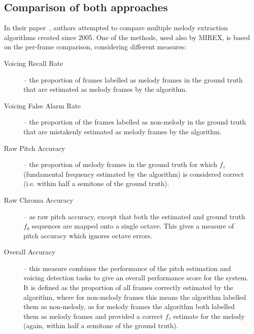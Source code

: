 \vspace{10pt}

\subsection{Comparison of both approaches}

In their paper~\cite{comparison}, authors attempted to compare multiple melody extraction algorithms created since 2005. One of the methods, used also by MIREX, is based on the per-frame comparison, considering different measures:

\begin{description}
\item[Voicing Recall Rate] -- the proportion of frames labelled as melody frames in the ground truth that are estimated as melody frames by the algorithm.
\item[Voicing False Alarm Rate] -- the proportion of the frames labelled as non-melody in the ground truth that are mistakenly estimated as melody frames by the algorithm.
\item[Raw Pitch Accuracy] -- the proportion of melody frames in the ground truth for which $f_{\tau}$ (fundamental frequency estimated by the algorithm) is considered correct (i.e. within half a semitone of the ground truth). 
\item[Raw Chroma Accuracy] -- as raw pitch accuracy, except that both the estimated and ground truth $f_{0}$ sequences are mapped onto a single octave. This gives a measure of pitch accuracy which ignores octave errors.
\item[Overall Accuracy] -- this measure combines the performance of the pitch estimation and voicing detection tasks to give an overall performance score for the system. It is defined as the proportion of all frames correctly estimated by the algorithm, where for non-melody frames this means the algorithm labelled them as non-melody, as for melody frames the algorithm both labelled them as melody frames and provided a correct $f_{\tau}$ estimate for the melody (again, within half a semitone of the ground truth).
\end{description}


